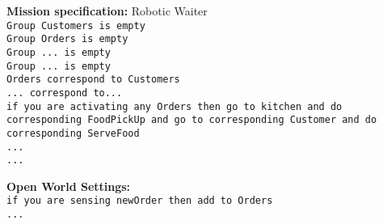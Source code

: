 \begin{algorithm}
	\textbf{Mission specification:} Robotic Waiter\\
	{\small
	\texttt{Group Customers is empty}\\
	\texttt{Group Orders is empty}\\
	\texttt{Group ... is empty}\\
	\texttt{Group ... is empty}\\
	
	\texttt{Orders correspond to Customers}\\
	\texttt{... correspond to...}\\
	
	\texttt{if you are activating any Orders then go to kitchen and do corresponding FoodPickUp and go to corresponding Customer and do corresponding ServeFood}\\
	\texttt{...}\\
	
	\texttt{...}\\
	}
	
	\textbf{Open World Settings:}\\
	{\small
	\texttt{if you are sensing newOrder then add to Orders}\\ %
	\texttt{...} 
	}
\end{algorithm}


